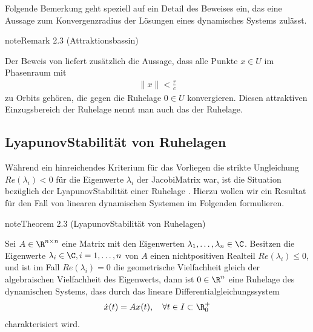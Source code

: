 \documentclass[letterpaper,10pt,english]{jupyterBook}
\begin{document}
\sphinxAtStartPar
Folgende Bemerkung geht speziell auf ein Detail des Beweises ein, das eine Aussage zum Konvergenzradius der Lösungen eines dynamisches Systems zulässt.
\label{odestability/ruhelagen:remark-6}
\begin{sphinxadmonition}{note}{Remark 2.3 (Attraktionsbassin)}



\sphinxAtStartPar
Der Beweis von {\hyperref[\detokenize{odestability/ruhelagen:thm:stabasymallg}]{}} liefert zusätzlich die Aussage, dass alle Punkte \(x\in U\) im Phasenraum mit
\begin{equation*}
\begin{split}\|x\| < \frac{r}{c}\end{split}
\end{equation*}
\sphinxAtStartPar
zu Orbits gehören, die gegen die Ruhelage \(0 \in U\) konvergieren.
Diesen attraktiven Einzugsbereich der Ruhelage nennt man auch das  der Ruhelage.
\end{sphinxadmonition}


\subsection{Lyapunov\sphinxhyphen{}Stabilität von Ruhelagen}
\label{\detokenize{odestability/ruhelagen:lyapunov-stabilitat-von-ruhelagen}}
\sphinxAtStartPar
Während ein hinreichendes Kriterium für das Vorliegen  die strikte Ungleichung \(Re(\lambda_i)<0\) für die Eigenwerte \(\lambda_i\) der Jacobi\sphinxhyphen{}Matrix war, ist die Situation bezüglich der Lyapunov\sphinxhyphen{}Stabilität einer Ruhelage .
Hierzu wollen wir ein Resultat für den Fall von linearen dynamischen Systemen im Folgenden formulieren.
\label{odestability/ruhelagen:thm:stablyaplinear}
\begin{sphinxadmonition}{note}{Theorem 2.3 (Lyapunov\sphinxhyphen{}Stabilität von Ruhelagen)}



\sphinxAtStartPar
Sei \(A\in \R^{n\times n}\) eine Matrix mit den Eigenwerten \(\lambda_1,\dots, \lambda_n\in \C\).
Besitzen die Eigenwerte \(\lambda_i \in \C, i=1,\ldots,n\) von \(A\) einen nicht\sphinxhyphen{}positiven Realteil \(Re(\lambda_i) \leq 0\), und ist im Fall \(Re(\lambda_i)=0\) die geometrische Vielfachheit gleich der algebraischen Vielfachheit des Eigenwerts, dann ist \(0\in \R^n\) eine  Ruhelage des dynamischen Systems, dass durch das lineare Differentialgleichungssystem
\begin{equation*}
\begin{split}\dot{x}(t) = Ax(t), \quad  \forall t \in I \subset \R^+_0\end{split}
\end{equation*}
\sphinxAtStartPar
charakterisiert wird.
\end{sphinxadmonition}
\end{document}
